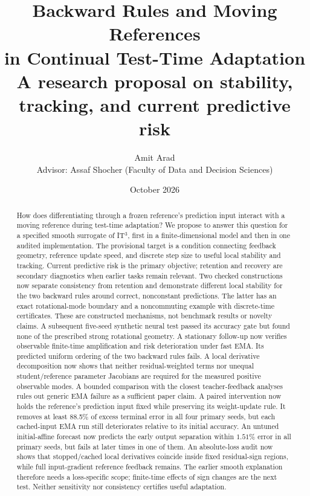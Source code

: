 \documentclass[11pt,a4paper]{article}
\title{Backward Rules and Moving References\\in Continual Test-Time Adaptation\\[0.4em]
\large A research proposal on stability, tracking, and current predictive risk}
\author{Amit Arad\\[0.3em]
\small Advisor: Assaf Shocher (Faculty of Data and Decision Sciences)}
\date{October 2026}
\begin{document}
\maketitle
\begin{abstract}
How does differentiating through a frozen reference's prediction input
interact with a moving reference during test-time adaptation? We propose
to answer this question for a specified smooth surrogate of IT$^3$, first
in a finite-dimensional model and then in one audited implementation.
The provisional target is a condition connecting feedback geometry,
reference update speed, and discrete step size to useful local stability
and tracking. Current predictive risk is the primary objective; retention
and recovery are secondary diagnostics when earlier tasks remain relevant.
Two checked constructions now separate consistency from retention and
demonstrate different local stability for the two backward rules around
correct, nonconstant predictions. The latter has an exact rotational-mode
boundary and a noncommuting example with discrete-time certificates.
These are constructed mechanisms, not benchmark results or novelty
claims. A subsequent five-seed synthetic neural test passed its accuracy
gate but found none of the prescribed strong rotational geometry. A
stationary follow-up now verifies observable finite-time amplification and
risk deterioration under fast EMA. Its predicted uniform ordering of the
two backward rules fails. A local derivative decomposition now shows that
neither residual-weighted terms nor unequal student/reference parameter
Jacobians are required for the measured positive observable modes.
A bounded comparison with the closest teacher-feedback analyses rules
out generic EMA failure as a sufficient paper claim. A paired intervention
now holds the reference's prediction input fixed while preserving its
weight-update rule. It removes at least 88.5\% of excess terminal error
in all four primary seeds, but each cached-input EMA run still deteriorates
relative to its initial accuracy. An untuned initial-affine forecast now
predicts the early output separation within $1.51\%$ error in all primary
seeds, but fails at later times in one of them. An absolute-loss audit
now shows that stopped/cached local derivatives coincide inside fixed
residual-sign regions, while full input-gradient reference feedback remains.
The earlier smooth explanation therefore needs a loss-specific scope;
finite-time effects of sign changes are the next test.
Neither sensitivity nor consistency certifies useful adaptation.
\end{abstract}
\end{document}
